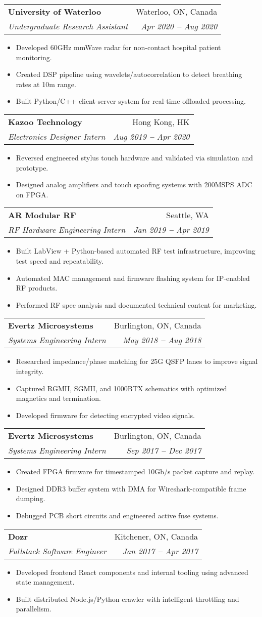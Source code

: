 \documentclass[letterpaper,11pt]{article}
\makeatletter
\newcommand{\resumeItem}[1]{
  \item\small{
    {#1 \vspace{-2pt}}
  }
}
\newcommand{\resumeSubheading}[4]{
  \vspace{-2pt}\item
    \begin{tabular*}{0.97\textwidth}[t]{l@{\extracolsep{\fill}}r}
      \textbf{#1} & #2 \\
      \textit{\small#3} & \textit{\small #4} \\
    \end{tabular*}\vspace{-7pt}
}
\newcommand{\resumeItemListStart}{\begin{itemize}}
\newcommand{\resumeItemListEnd}{\end{itemize}\vspace{-5pt}}
\makeatother
\begin{document}
  \resumeSubheading
    {University of Waterloo}{Waterloo, ON, Canada}
    {Undergraduate Research Assistant}{Apr 2020 \textbf{--} Aug 2020}
    \resumeItemListStart
      \resumeItem{Developed 60GHz mmWave radar for non-contact hospital patient monitoring.}
      \resumeItem{Created DSP pipeline using wavelets/autocorrelation to detect breathing rates at 10m range.}
      \resumeItem{Built Python/C++ client-server system for real-time offloaded processing.}
    \resumeItemListEnd

  \resumeSubheading
    {Kazoo Technology}{Hong Kong, HK}
    {Electronics Designer Intern}{Aug 2019 \textbf{--} Apr 2020}
    \resumeItemListStart
      \resumeItem{Reversed engineered stylus touch hardware and validated via simulation and prototype.}
      \resumeItem{Designed analog amplifiers and touch spoofing systems with 200MSPS ADC on FPGA.}
    \resumeItemListEnd

  \resumeSubheading
    {AR Modular RF}{Seattle, WA}
    {RF Hardware Engineering Intern}{Jan 2019 \textbf{--} Apr 2019}
    \resumeItemListStart
      \resumeItem{Built LabView + Python-based automated RF test infrastructure, improving test speed and repeatability.}
      \resumeItem{Automated MAC management and firmware flashing system for IP-enabled RF products.}
      \resumeItem{Performed RF spec analysis and documented technical content for marketing.}
    \resumeItemListEnd

  \resumeSubheading
    {Evertz Microsystems}{Burlington, ON, Canada}
    {Systems Engineering Intern}{May 2018 \textbf{--} Aug 2018}
    \resumeItemListStart
      \resumeItem{Researched impedance/phase matching for 25G QSFP lanes to improve signal integrity.}
      \resumeItem{Captured RGMII, SGMII, and 1000BTX schematics with optimized magnetics and termination.}
      \resumeItem{Developed firmware for detecting encrypted video signals.}
    \resumeItemListEnd

  \resumeSubheading
    {Evertz Microsystems}{Burlington, ON, Canada}
    {Systems Engineering Intern}{Sep 2017 \textbf{--} Dec 2017}
    \resumeItemListStart
      \resumeItem{Created FPGA firmware for timestamped 10Gb/s packet capture and replay.}
      \resumeItem{Designed DDR3 buffer system with DMA for Wireshark-compatible frame dumping.}
      \resumeItem{Debugged PCB short circuits and engineered active fuse systems.}
    \resumeItemListEnd

  \resumeSubheading
    {Dozr}{Kitchener, ON, Canada}
    {Fullstack Software Engineer}{Jan 2017 \textbf{--} Apr 2017}
    \resumeItemListStart
      \resumeItem{Developed frontend React components and internal tooling using advanced state management.}
      \resumeItem{Built distributed Node.js/Python crawler with intelligent throttling and parallelism.}
    \resumeItemListEnd
\end{document}
